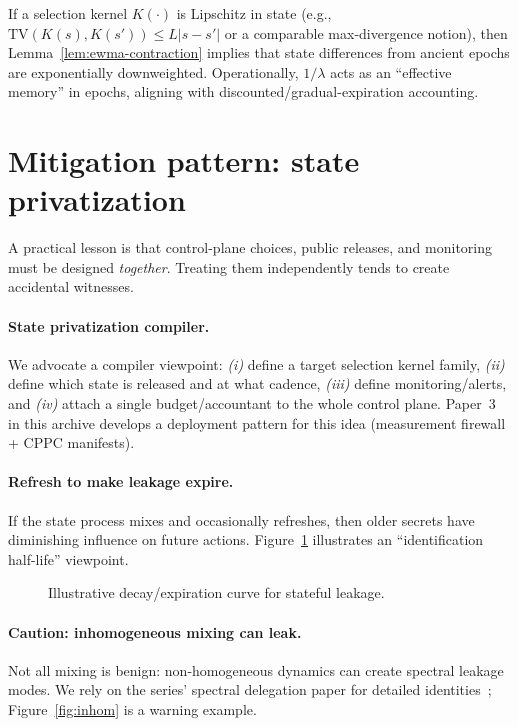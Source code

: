 \documentclass[11pt]{article}
\newcommand{\TV}{\mathrm{TV}}
\begin{document}
If a selection kernel $K(\cdot)$ is Lipschitz in state (e.g., $\TV(K(s),K(s'))\le L|s-s'|$ or a comparable max-divergence notion), then Lemma~\ref{lem:ewma-contraction} implies that state differences from ancient epochs are exponentially downweighted.
Operationally, $1/\lambda$ acts as an ``effective memory'' in epochs, aligning with discounted/gradual-expiration accounting.


\section{Mitigation pattern: state privatization}
\label{sec:mitigations}

A practical lesson is that control-plane choices, public releases, and monitoring must be designed \emph{together}.
Treating them independently tends to create accidental witnesses.

\paragraph{State privatization compiler.}
We advocate a compiler viewpoint:
\emph{(i)} define a target selection kernel family, \emph{(ii)} define which state is released and at what cadence,
\emph{(iii)} define monitoring/alerts, and \emph{(iv)} attach a single budget/accountant to the whole control plane.
Paper~3 in this archive develops a deployment pattern for this idea (measurement firewall + CPPC manifests).

\paragraph{Refresh to make leakage expire.}
If the state process mixes and occasionally refreshes, then older secrets have diminishing influence on future actions.
Figure~\ref{fig:forgetting} illustrates an ``identification half-life'' viewpoint.

\begin{figure}[t]
  \centering
  \caption{Illustrative decay/expiration curve for stateful leakage.}
  \label{fig:forgetting}
\end{figure}

\paragraph{Caution: inhomogeneous mixing can leak.}
Not all mixing is benign: non-homogeneous dynamics can create spectral leakage modes.
We rely on the series' spectral delegation paper for detailed identities~\cite{series:spectral};
Figure~\ref{fig:inhom} is a warning example.
\end{document}
